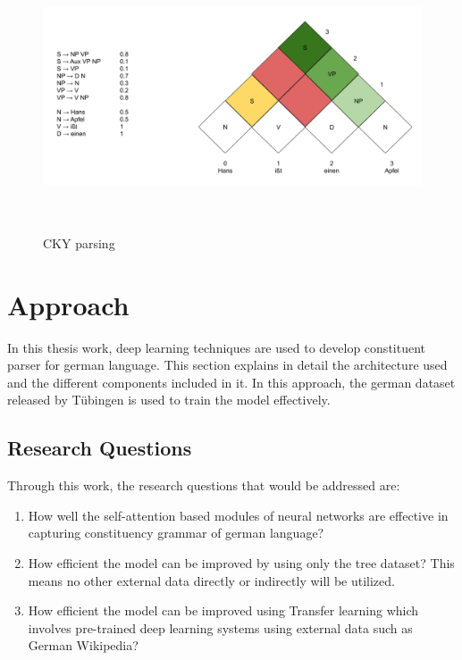 \documentclass[a4paper, 11pt]{article}
\begin{document}
\begin{figure}[htpb]
    \centering
    \includegraphics[width=\textwidth,height=8cm,keepaspectratio=true]
    {cky-parsing-chart-2.png}
    \caption{
        CKY parsing
    }
    \label{fig:cky_parser_2}
\end{figure}

\pagebreak
\section{Approach}  

In this thesis work, deep learning techniques are used to develop constituent parser for german language. This section explains in detail the architecture used and the different components included in it. In this approach, the german dataset released by Tübingen is used to train the model effectively.

\subsection{Research Questions}

Through this work, the research questions that would be addressed are:
\begin{enumerate}
\item How well the self-attention based modules of neural networks are effective in capturing constituency grammar of german language? 
\item How efficient the model can be improved by using only the tree dataset? This means no other external data directly or indirectly will be utilized. 
\item How efficient the model can be improved using Transfer learning which involves pre-trained deep learning systems using external data such as German Wikipedia?
\end{enumerate}
\end{document}

